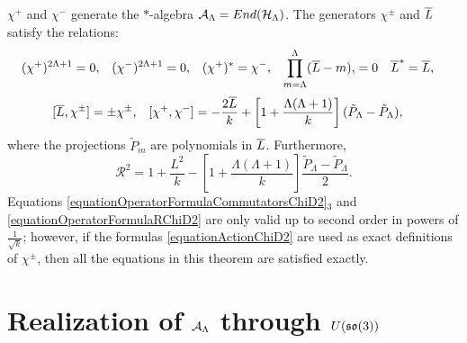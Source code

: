 \begin{theorem}[Summary]
$\chi^+$ and $\chi^-$ generate the $*$-algebra $\mathcal A_\Lambda = End(\mathcal H_\Lambda)$. The generators $\chi^\pm$ and $\overline{L}$ satisfy  the relations:
\begin{align}\label{equationOperatorFormulaRelationsChiD2}
    (\chi^+)^{2\Lambda+1} &= 0, & 
    (\chi^-)^{2\Lambda+1} &= 0, & 
    (\chi^+)^*&= \chi^-, & 
    \prod_{m = \Lambda}^\Lambda (\overline{L} - m), &= 0 & 
    \overline{L}^* &= \overline{L},
\end{align}
\begin{align}\label{equationOperatorFormulaCommutatorsChiD2}
    [\overline{L}, \chi^\pm] &= \pm \chi^\pm,&
    [\chi^+, \chi^-] &= - \frac{2\overline{L}}{k} + \left[ 1 + \frac{\Lambda(\Lambda+1)}{k}\right](\tilde P_\Lambda - \tilde P_\Lambda),
\end{align}
where the projections $\tilde P_m$ are polynomials in $\overline{L}$. Furthermore,
\begin{equation}\label{equationOperatorFormulaRChiD2}
    \mathcal R^2 = 1 + \frac{L^2}{k} - \left[ 1 + \frac{\Lambda(\Lambda+1)}{k}\right]\frac{\tilde P_\Lambda - \tilde P_\Lambda}{2}.
\end{equation}
Equations \eqref{equationOperatorFormulaCommutatorsChiD2}$_3$ and \eqref{equationOperatorFormulaRChiD2} are only valid up to second order in powers of $\frac{1}{\sqrt{k}}$; however, if the formulas \eqref{equationActionChiD2} are used as exact definitions of $\chi^\pm$, then all the equations in this theorem are satisfied exactly.
\end{theorem}

\linea







\section{Realization of $\mathcal A_\Lambda$ through $U(\mathfrak{so}(3))$}

